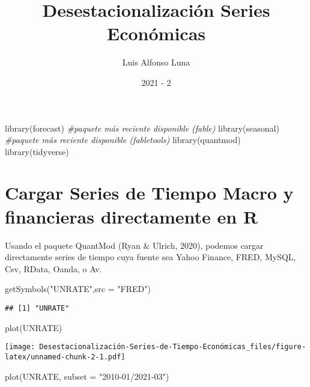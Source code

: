 \documentclass[
]{article}
\title{Desestacionalización Series Económicas}
\author{Luis Alfonso Luna}
\date{2021 - 2}
\newenvironment{Shaded}{\begin{snugshade}}{\end{snugshade}}
\newcommand{\AttributeTok}[1]{\textcolor[rgb]{0.77,0.63,0.00}{#1}}
\newcommand{\CommentTok}[1]{\textcolor[rgb]{0.56,0.35,0.01}{\textit{#1}}}
\newcommand{\FunctionTok}[1]{\textcolor[rgb]{0.00,0.00,0.00}{#1}}
\newcommand{\NormalTok}[1]{#1}
\newcommand{\StringTok}[1]{\textcolor[rgb]{0.31,0.60,0.02}{#1}}
\begin{document}
\maketitle

\begin{Shaded}
\begin{Highlighting}[]
\FunctionTok{library}\NormalTok{(forecast) }\CommentTok{\#paquete más reciente disponible (fable)}
\FunctionTok{library}\NormalTok{(seasonal) }\CommentTok{\#paquete más reciente disponible (fabletools)}
\FunctionTok{library}\NormalTok{(quantmod) }
\FunctionTok{library}\NormalTok{(tidyverse)}
\end{Highlighting}
\end{Shaded}

\hypertarget{cargar-series-de-tiempo-macro-y-financieras-directamente-en-r}{%
\section{Cargar Series de Tiempo Macro y financieras directamente en
R}\label{cargar-series-de-tiempo-macro-y-financieras-directamente-en-r}}

Usando el paquete QuantMod (Ryan \& Ulrich, 2020), podemos cargar
directamente series de tiempo cuya fuente sea Yahoo Finance, FRED,
MySQL, Csv, RData, Oanda, o Av.

\begin{Shaded}
\begin{Highlighting}[]
\FunctionTok{getSymbols}\NormalTok{(}\StringTok{"UNRATE"}\NormalTok{,}\AttributeTok{src =} \StringTok{"FRED"}\NormalTok{)}
\end{Highlighting}
\end{Shaded}

\begin{verbatim}
## [1] "UNRATE"
\end{verbatim}

\begin{Shaded}
\begin{Highlighting}[]
\FunctionTok{plot}\NormalTok{(UNRATE)}
\end{Highlighting}
\end{Shaded}

\texttt{[image: Desestacionalización-Series-de-Tiempo-Económicas\_files/figure-latex/unnamed-chunk-2-1.pdf]}

\begin{Shaded}
\begin{Highlighting}[]
\FunctionTok{plot}\NormalTok{(UNRATE, }\AttributeTok{subset =} \StringTok{"2010{-}01/2021{-}03"}\NormalTok{)}
\end{Highlighting}
\end{Shaded}
\end{document}
